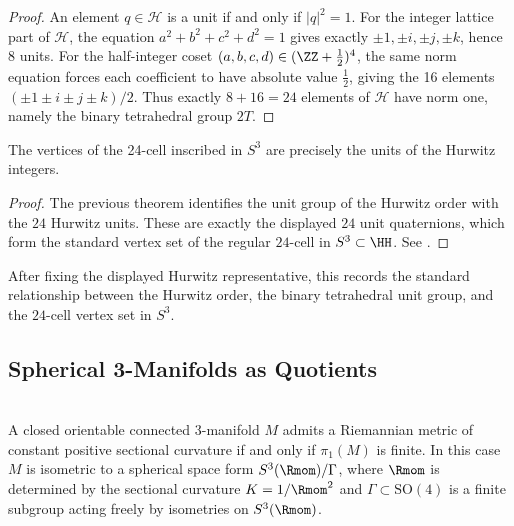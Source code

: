 \documentclass[11pt]{article}
\begin{document}
\begin{proof}
An element $q \in \mathcal{H}$ is a unit if and only if $|q|^2 = 1$.
For the integer lattice part of \(\mathcal H\), the equation
\(a^2+b^2+c^2+d^2=1\) gives exactly
\(\pm1,\pm i,\pm j,\pm k\), hence 8 units.  For the half-integer coset
\((a,b,c,d)\in(\ZZ+\tfrac12)^4\), the same norm equation forces each
coefficient to have absolute value \(\tfrac12\), giving the 16 elements
\((\pm1\pm i\pm j\pm k)/2\).  Thus exactly \(8+16=24\) elements of
\(\mathcal H\) have norm one, namely the binary tetrahedral group \(2T\).
\end{proof}

\begin{corollary}
\label{p1:cor:hurwitz-units-24cell-vertices}
The vertices of the 24-cell inscribed in $S^3$ are precisely the units 
of the Hurwitz integers.
\cite{voight2021quaternion,coxeter1973regular}
\end{corollary}

\begin{proof}
The previous theorem identifies the unit group of the Hurwitz order with the \(24\) Hurwitz units. These are exactly the displayed \(24\) unit quaternions, which form the standard vertex set of the regular \(24\)-cell in \(S^3\subset\HH\). See \cite{voight2021quaternion,coxeter1973regular}.
\end{proof}


After fixing the displayed Hurwitz representative, this records the standard relationship between the Hurwitz order, the binary tetrahedral unit group, and the \(24\)-cell vertex set in \(S^3\).


\subsection{Spherical 3-Manifolds as Quotients}
\label{p1:subsec:spherical-quotients}

\begin{theorem}
\label{p1:thm:elliptization-spherical-space-form}
\mbox{}\\[6pt] 
A closed orientable connected 3-manifold $M$ admits a Riemannian metric of constant positive sectional curvature if and only if $\pi_1(M)$ is finite. In this case $M$ is isometric to a spherical space form $S^3(\Rmom)/\Gamma$, where $\Rmom$ is determined by the sectional curvature $K=1/\Rmom^2$ and $\Gamma \subset \mathrm{SO}(4)$ is a finite subgroup acting freely by isometries on $S^3(\Rmom)$.
\cite{Thurston1997,Perelman2002entropy,Perelman2003surgery,Perelman2003extinction,wolf2011spaces}
\end{theorem}
\end{document}
